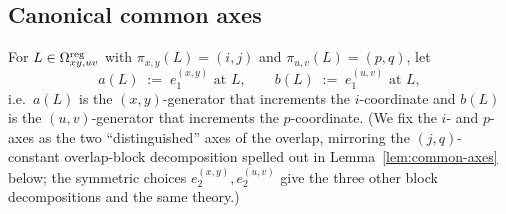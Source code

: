 \subsection*{Canonical common axes}

\begin{definition}\label{def:common-axes}
For $L\in\Omega^{\mathrm{reg}}_{xy,uv}$ with $\pi_{x,y}(L)=(i,j)$ and $\pi_{u,v}(L)=(p,q)$,
let
\[
  a(L)\;:=\; e_1^{(x,y)}\text{ at }L,
  \qquad
  b(L)\;:=\; e_1^{(u,v)}\text{ at }L,
\]
i.e.\ $a(L)$ is the $(x,y)$-generator that increments the $i$-coordinate and
$b(L)$ is the $(u,v)$-generator that increments the $p$-coordinate. (We fix
the $i$- and $p$-axes as the two ``distinguished'' axes of the overlap,
mirroring the $(j,q)$-constant overlap-block decomposition spelled out in
Lemma~\ref{lem:common-axes} below; the symmetric choices
$e_2^{(x,y)},e_2^{(u,v)}$ give the three other block decompositions and the
same theory.)
\end{definition}

